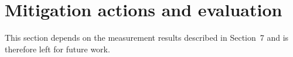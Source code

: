 \section{Mitigation actions and evaluation}

This section depends on the measurement results described in Section~7 and is therefore
left for future work.
